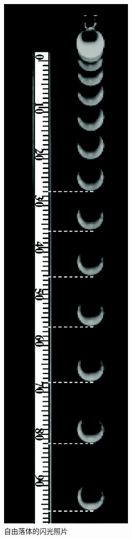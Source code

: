 \begin{figure}[H]
    \centering
    \includegraphics[scale=.3, angle=90]{figure/2-21.png}
    \caption{自由落体的闪光照片}
\end{figure}

